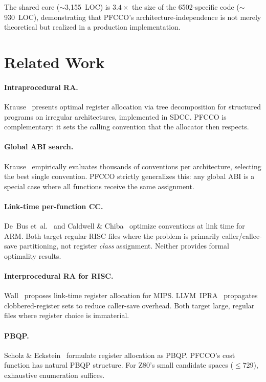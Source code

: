 \documentclass[sigplan,screen,nonacm]{acmart}
\begin{document}
\noindent The shared core ($\sim$3{,}155~LOC) is $3.4\times$ the size of the
6502-specific code ($\sim$930~LOC), demonstrating that PFCCO's
architecture-independence is not merely theoretical but realized in a
production implementation.

\section{Related Work}
\label{sec:related}

\paragraph{Intraprocedural RA.}
Krause~\cite{krause2013} presents optimal register allocation via tree
decomposition for structured programs on irregular architectures,
implemented in SDCC.  PFCCO is complementary: it sets the calling convention
that the allocator then respects.

\paragraph{Global ABI search.}
Krause~\cite{krause2022} empirically evaluates thousands of conventions per
architecture, selecting the best single convention.  PFCCO strictly
generalizes this: any global ABI is a special case where all functions
receive the same assignment.

\paragraph{Link-time per-function CC.}
De~Bus et~al.~\cite{debus2004} and Caldwell \&
Chiba~\cite{caldwell2017} optimize conventions at link time for ARM.  Both
target regular RISC files where the problem is primarily caller/callee-save
partitioning, not register \emph{class} assignment.  Neither provides formal
optimality results.

\paragraph{Interprocedural RA for RISC.}
Wall~\cite{wall1986} proposes link-time register allocation for MIPS.
LLVM~IPRA~\cite{llvm-ipra} propagates clobbered-register sets to reduce
caller-save overhead.  Both target large, regular files where register
choice is immaterial.

\paragraph{PBQP.}
Scholz \& Eckstein~\cite{scholz2002} formulate register allocation as PBQP.
PFCCO's cost function has natural PBQP structure.  For Z80's small candidate
spaces ($\le$729), exhaustive enumeration suffices.
\end{document}

